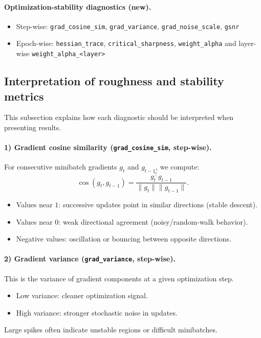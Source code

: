 \paragraph{Optimization-stability diagnostics (new).}
\begin{itemize}
    \item Step-wise: \texttt{grad\_cosine\_sim}, \texttt{grad\_variance},
          \texttt{grad\_noise\_scale}, \texttt{gsnr}
    \item Epoch-wise: \texttt{hessian\_trace}, \texttt{critical\_sharpness},
          \texttt{weight\_alpha} and layer-wise \texttt{weight\_alpha\_<layer>}
\end{itemize}

\subsection{Interpretation of roughness and stability metrics}

This subsection explains how each diagnostic should be interpreted when
presenting results.

\paragraph{1) Gradient cosine similarity (\texttt{grad\_cosine\_sim}, step-wise).}
For consecutive minibatch gradients \(g_t\) and \(g_{t-1}\), we compute:
\[
\cos(g_t, g_{t-1}) = \frac{g_t^\top g_{t-1}}{\|g_t\|\|g_{t-1}\|}.
\]
\begin{itemize}
    \item Values near \(1\): successive updates point in similar directions (stable descent).
    \item Values near \(0\): weak directional agreement (noisy/random-walk behavior).
    \item Negative values: oscillation or bouncing between opposite directions.
\end{itemize}

\paragraph{2) Gradient variance (\texttt{grad\_variance}, step-wise).}
This is the variance of gradient components at a given optimization step.
\begin{itemize}
    \item Low variance: cleaner optimization signal.
    \item High variance: stronger stochastic noise in updates.
\end{itemize}
Large spikes often indicate unstable regions or difficult minibatches.

